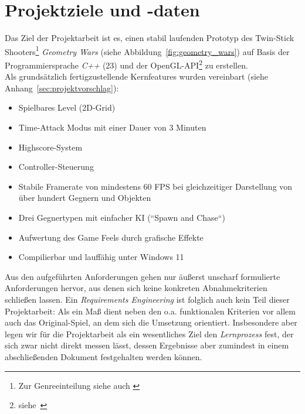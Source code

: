 \section{Projektziele und -daten}\label{sec:projektdaten}

Das Ziel der Projektarbeit ist es, einen stabil laufenden Prototyp des Twin-Stick Shooters\footnote{
Zur Genreeinteilung siehe auch \cite[]{GameDeveloper}
} \textit{Geometry Wars} (siehe Abbildung~\ref{fig:geometry_wars}) auf Basis der Programmiersprache \textit{C++} (23) und der OpenGL-API\footnote{siehe~\cite[]{OpenGLHomepage}
}  zu erstellen.\\

\noindent
Als grundsätzlich fertigzustellende Kernfeatures wurden vereinbart (siehe Anhang~\ref{sec:projektvorschlag}):

\vspace{2mm}
\begin{itemize}
    \itemsep0.5em
    \item Spielbares Level (2D-Grid)
    \item Time-Attack Modus mit einer Dauer von 3 Minuten
    \item Highscore-System
    \item Controller-Steuerung
    \item Stabile Framerate von mindestens 60 FPS bei gleichzeitiger Darstellung von über hundert Gegnern und Objekten
    \item Drei Gegnertypen mit einfacher KI (``Spawn and Chase``)
    \item Aufwertung des Game Feels durch grafische Effekte
    \item Compilierbar und lauffähig unter Windows 11
\end{itemize}
\vspace{2mm}

Aus den aufgeführten Anforderungen gehen nur äußerst unscharf formulierte Anforderungen hervor, aus denen sich keine konkreten Abnahmekriterien schließen lassen.
Ein \textit{Requirements Engineering} ist folglich auch kein Teil dieser Projektarbeit: Als ein Maß dient neben den o.a. funktionalen Kriterien vor allem auch das Original-Spiel, an dem sich die Umsetzung orientiert.
Insbesondere aber legen wir für die Projektarbeit als ein wesentliches Ziel den \textit{Lernprozess} fest, der sich zwar nicht direkt messen lässt, dessen Ergebnisse aber zumindest in einem abschließenden Dokument festgehalten werden können.

